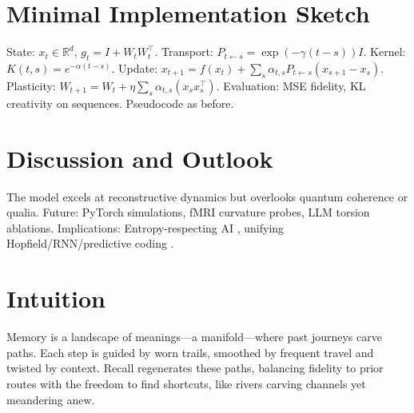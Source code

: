 \documentclass[a4paper,12pt]{article}
\begin{document}
\section{Minimal Implementation Sketch}
State: $x_t \in \mathbb{R}^d$, $g_t = I + W_t W_t^\top$. Transport: $P_{t \leftarrow s} = \exp(-\gamma (t-s)) I$. Kernel: $K(t,s) = e^{-\alpha (t-s)}$. Update: $x_{t+1} = f(x_t) + \sum_s \alpha_{t,s} P_{t \leftarrow s} (x_{s+1} - x_s)$. Plasticity: $W_{t+1} = W_t + \eta \sum_s \alpha_{t,s} (x_s x_s^\top)$. Evaluation: MSE fidelity, KL creativity on sequences. Pseudocode as before.

\section{Discussion and Outlook}
The model excels at reconstructive dynamics but overlooks quantum coherence \citep{penrose1989road} or qualia. Future: PyTorch simulations, fMRI curvature probes, LLM torsion ablations. Implications: Entropy-respecting AI \citep{semantic2025}, unifying Hopfield/RNN/predictive coding \citep{hopfield1982neural,vaswani2017attention,friston2010free}.

\section{Intuition}
Memory is a landscape of meanings—a manifold—where past journeys carve paths. Each step is guided by worn trails, smoothed by frequent travel and twisted by context. Recall regenerates these paths, balancing fidelity to prior routes with the freedom to find shortcuts, like rivers carving channels yet meandering anew.



\end{document}
